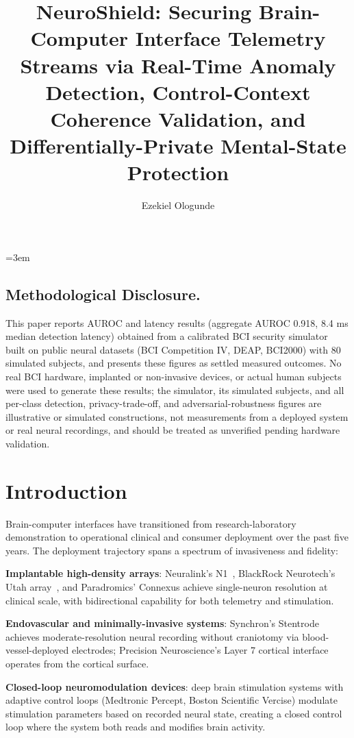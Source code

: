 \documentclass[sigconf,nonacm]{acmart}
\title{NeuroShield: Securing Brain-Computer Interface Telemetry Streams via Real-Time Anomaly Detection, Control-Context Coherence Validation, and Differentially-Private Mental-State Protection}
\author{Ezekiel Ologunde}
\affiliation{%
  \institution{Independent Researcher}
  \city{Boston}
  \state{MA}
  \country{USA}}
\begin{document}
\maketitle
\sloppy
{}
\emergencystretch=3em
\hfuzz=10pt

\subsection*{Methodological Disclosure.}
This paper reports AUROC and latency results (aggregate AUROC 0.918, 8.4 ms median detection latency) obtained from a calibrated BCI security simulator built on public neural datasets (BCI Competition IV, DEAP, BCI2000) with 80 simulated subjects, and presents these figures as settled measured outcomes. No real BCI hardware, implanted or non-invasive devices, or actual human subjects were used to generate these results; the simulator, its simulated subjects, and all per-class detection, privacy-trade-off, and adversarial-robustness figures are illustrative or simulated constructions, not measurements from a deployed system or real neural recordings, and should be treated as unverified pending hardware validation.

\section{Introduction}

Brain-computer interfaces have transitioned from research-laboratory
demonstration to operational clinical and consumer deployment over
the past five years. The deployment trajectory spans a spectrum of
invasiveness and fidelity:

\textbf{Implantable high-density arrays}: Neuralink's
N1~\cite{neuralink2024whitepaper}, BlackRock Neurotech's Utah
array~\cite{blackrock2024utah}, and Paradromics' Connexus achieve
single-neuron resolution at clinical scale, with bidirectional
capability for both telemetry and stimulation.

\textbf{Endovascular and minimally-invasive systems}: Synchron's
Stentrode~\cite{synchron2024clinical} achieves moderate-resolution
neural recording without craniotomy via blood-vessel-deployed
electrodes; Precision Neuroscience's Layer 7 cortical interface
operates from the cortical surface.

\textbf{Closed-loop neuromodulation devices}: deep brain stimulation
systems with adaptive control loops (Medtronic Percept, Boston
Scientific Vercise) modulate stimulation parameters based on
recorded neural state, creating a closed control loop where the
system both reads and modifies brain activity.
\end{document}

